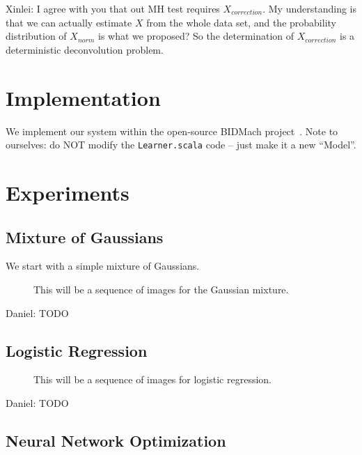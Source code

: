 \documentclass{article}
\begin{document}
{\color{blue} Xinlei: I agree with you that out MH test requires $X_{correction}$. My understanding
is that we can actually estimate $X$ from the whole data set, and the probability distribution of
$X_{norm}$ is what we proposed? So the determination of $X_{correction}$ is a deterministic
deconvolution problem.  }




\section{Implementation}\label{sec:implementation}

We implement our system within the open-source BIDMach project~\cite{canny2013bidmach}. Note to
ourselves: do NOT modify the \texttt{Learner.scala} code -- just make it a new ``Model''.




\section{Experiments}\label{sec:experiments}

\subsection{Mixture of Gaussians}\label{ssec:gaussians}

We start with a simple mixture of Gaussians.

\begin{figure}[ht]
  \centering
  \fbox{\rule[-.5cm]{0cm}{4cm} \rule[-.5cm]{4cm}{0cm}}
  \caption{This will be a sequence of images for the Gaussian mixture.}
\end{figure}

{\color{blue}
Daniel: TODO
}

\subsection{Logistic Regression}\label{ssec:logistic}

\begin{figure}[ht]
  \centering
  \fbox{\rule[-.5cm]{0cm}{4cm} \rule[-.5cm]{4cm}{0cm}}
  \caption{This will be a sequence of images for logistic regression.}
\end{figure}

{\color{blue}
Daniel: TODO
}

\subsection{Neural Network Optimization}\label{ssec:nets}
\end{document}
